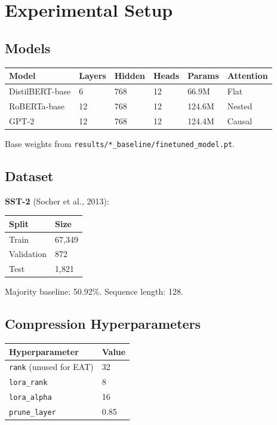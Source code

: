 
\section{Experimental Setup}

\subsection{Models}

\begin{table}[H]
\centering
\small
\begin{tabular}{llllll}
\toprule
\textbf{Model} & \textbf{Layers} & \textbf{Hidden} & \textbf{Heads} & \textbf{Params} & \textbf{Attention} \\
\midrule
DistilBERT-base & 6 & 768 & 12 & 66.9M & Flat \\
RoBERTa-base & 12 & 768 & 12 & 124.6M & Nested \\
GPT-2 & 12 & 768 & 12 & 124.4M & Causal \\
\bottomrule
\end{tabular}
\end{table}

Base weights from \texttt{results/*\_baseline/finetuned\_model.pt}.

\subsection{Dataset}

\textbf{SST-2} (Socher et al., 2013):

\begin{table}[H]
\centering
\small
\begin{tabular}{ll}
\toprule
\textbf{Split} & \textbf{Size} \\
\midrule
Train & 67,349 \\
Validation & 872 \\
Test & 1,821 \\
\bottomrule
\end{tabular}
\end{table}

Majority baseline: 50.92\%. Sequence length: 128.

\subsection{Compression Hyperparameters}

\begin{table}[H]
\centering
\small
\begin{tabular}{ll}
\toprule
\textbf{Hyperparameter} & \textbf{Value} \\
\midrule
\texttt{rank} (unused for EAT) & 32 \\
\texttt{lora\_rank} & 8 \\
\texttt{lora\_alpha} & 16 \\
\texttt{prune\_layer} & 0.85 \\
\bottomrule
\end{tabular}
\end{table}

